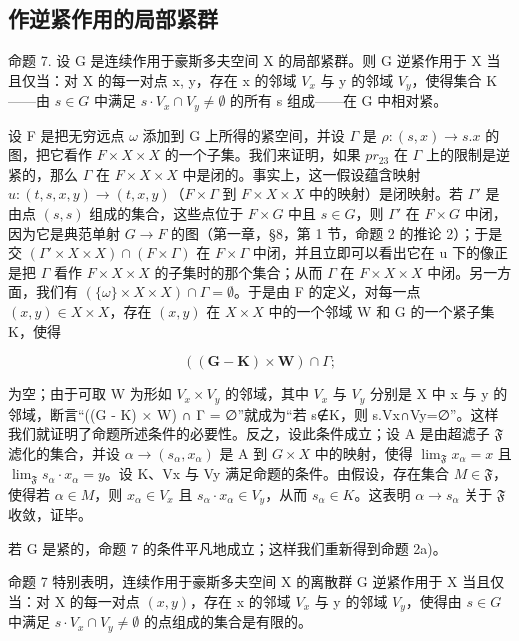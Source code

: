 \subsection{作逆紧作用的局部紧群}

命题 7. 设 G 是连续作用于豪斯多夫空间 X 的局部紧群。则 G 逆紧作用于 X 当且仅当：对 X 的每一对点 x, y，存在 x 的邻域 \(V_{x}\) 与 y 的邻域 \(V_{y}\)，使得集合 K——由 \(s \in G\) 中满足 \(s \cdot V_{x} \cap V_{y} \neq \emptyset\) 的所有 s 组成——在 G 中相对紧。

设 F 是把无穷远点 \(\omega\) 添加到 G 上所得的紧空间，并设 \(\Gamma\) 是 \(\rho: (s, x) \to s.x\) 的图，把它看作 \(F \times X \times X\) 的一个子集。我们来证明，如果 \(pr_{23}\) 在 \(\Gamma\) 上的限制是逆紧的，那么 \(\Gamma\) 在 \(F \times X \times X\) 中是闭的。事实上，这一假设蕴含映射 \(u: (t, s, x, y) \to (t, x, y)\)（\(F \times \Gamma\) 到 \(F \times X \times X\) 中的映射）是闭映射。若 \(\Gamma'\) 是由点 \((s, s)\) 组成的集合，这些点位于 \(F \times G\) 中且 \(s \in G\)，则 \(\Gamma'\) 在 \(F \times G\) 中闭，因为它是典范单射 \(G \to F\) 的图（第一章，§8，第 1 节，命题 2 的推论 2）；于是交 \((\Gamma' \times X \times X) \cap (F \times \Gamma)\) 在 \(F \times \Gamma\) 中闭，并且立即可以看出它在 u 下的像正是把 \(\Gamma\) 看作 \(F \times X \times X\) 的子集时的那个集合；从而 \(\Gamma\) 在 \(F \times X \times X\) 中闭。另一方面，我们有 \((\{\omega\} \times X \times X) \cap \Gamma = \emptyset\)。于是由 F 的定义，对每一点 \((x, y) \in X \times X\)，存在 \((x, y)\) 在 \(X \times X\) 中的一个邻域 W 和 G 的一个紧子集 K，使得

\[
((\mathbf {G} - \mathbf {K}) \times \mathbf {W}) \cap \Gamma ;
\]

为空；由于可取 W 为形如 \(V_{x} \times V_{y}\) 的邻域，其中 \(V_{x}\) 与 \(V_{y}\) 分别是 X 中 x 与 y 的邻域，断言“((G - K) × W) ∩ Γ = ∅”就成为“若 s∉K，则 s.Vx∩Vy=∅”。这样我们就证明了命题所述条件的必要性。反之，设此条件成立；设 A 是由超滤子 \(\mathfrak{F}\) 滤化的集合，并设 \(\alpha \to (s_{\alpha}, x_{\alpha})\) 是 A 到 \(G \times X\) 中的映射，使得 \(\lim_{\mathfrak{F}} x_{\alpha} = x\) 且 \(\lim_{\mathfrak{F}} s_{\alpha}\cdot x_{\alpha} = y\)。设 K、Vx 与 Vy 满足命题的条件。由假设，存在集合 \(M \in \mathfrak{F}\)，使得若 \(\alpha \in M\)，则 \(x_{\alpha} \in V_{x}\) 且 \(s_{\alpha}\cdot x_{\alpha} \in V_{y}\)，从而 \(s_{\alpha} \in K\)。这表明 \(\alpha \to s_{\alpha}\) 关于 \(\mathfrak{F}\) 收敛，证毕。

若 G 是紧的，命题 7 的条件平凡地成立；这样我们重新得到命题 2a)。

命题 7 特别表明，连续作用于豪斯多夫空间 X 的离散群 G 逆紧作用于 X 当且仅当：对 X 的每一对点 \((x, y)\)，存在 x 的邻域 \(V_{x}\) 与 y 的邻域 \(V_{y}\)，使得由 \(s \in G\) 中满足 \(s \cdot V_{x} \cap V_{y} \neq \emptyset\) 的点组成的集合是有限的。

